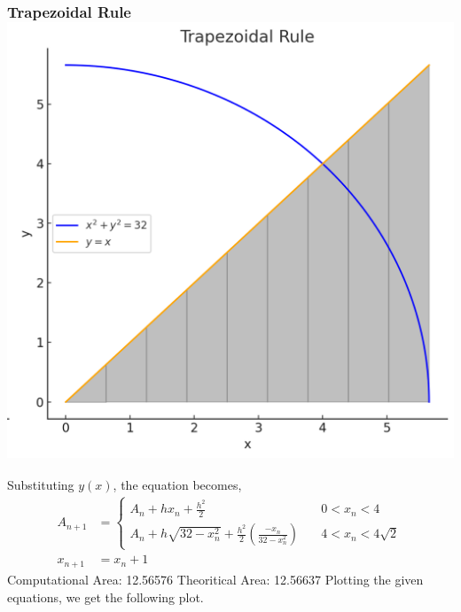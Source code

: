 \documentclass{beamer}
\providecommand{\brak}[1]{\ensuremath{\left(#1\right)}}
\theoremstyle{remark}
\numberwithin{equation}{section}
\begin{document}
\begin{frame}

\frametitle{\hspace{0.5em} Trapezoidal Rule \hfill \includegraphics[scale=0.1]{figs/4.png}}
Substituting $y\brak{x}$, the equation becomes,
\begin{align}
    A_{n + 1} &=
    \begin{cases}
        A_n + h x_n + \frac{h^2}{2} & \quad 0 < x_n < 4\\
	    A_n + h\sqrt{32 - x_n^2} + \frac{h^2}{2}\brak{\frac{-x_n}{32 - x_n^2}} & \quad 4 < x_n < 4\sqrt{2}
    \end{cases}\\
    x_{n + 1} &= x_n + 1
\end{align}
Computational Area: 12.56576
\newline
Theoritical Area: 12.56637
\newline
Plotting the given equations, we get the following plot.

\end{frame}
\end{document}
